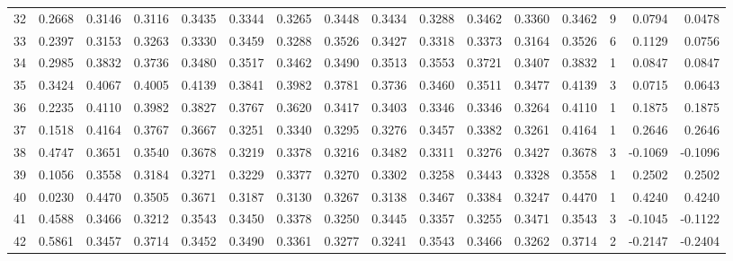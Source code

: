 \begin{tabular}{lrrrrrrrrrrrrrrr}
32  &      0.2668 &  0.3146 &  0.3116 &  0.3435 &  0.3344 &  0.3265 &  0.3448 &  0.3434 &  0.3288 &  0.3462 &   0.3360 &     0.3462 &      9 &                    0.0794 &                     0.0478 \\
33  &      0.2397 &  0.3153 &  0.3263 &  0.3330 &  0.3459 &  0.3288 &  0.3526 &  0.3427 &  0.3318 &  0.3373 &   0.3164 &     0.3526 &      6 &                    0.1129 &                     0.0756 \\
34  &      0.2985 &  0.3832 &  0.3736 &  0.3480 &  0.3517 &  0.3462 &  0.3490 &  0.3513 &  0.3553 &  0.3721 &   0.3407 &     0.3832 &      1 &                    0.0847 &                     0.0847 \\
35  &      0.3424 &  0.4067 &  0.4005 &  0.4139 &  0.3841 &  0.3982 &  0.3781 &  0.3736 &  0.3460 &  0.3511 &   0.3477 &     0.4139 &      3 &                    0.0715 &                     0.0643 \\
36  &      0.2235 &  0.4110 &  0.3982 &  0.3827 &  0.3767 &  0.3620 &  0.3417 &  0.3403 &  0.3346 &  0.3346 &   0.3264 &     0.4110 &      1 &                    0.1875 &                     0.1875 \\
37  &      0.1518 &  0.4164 &  0.3767 &  0.3667 &  0.3251 &  0.3340 &  0.3295 &  0.3276 &  0.3457 &  0.3382 &   0.3261 &     0.4164 &      1 &                    0.2646 &                     0.2646 \\
38  &      0.4747 &  0.3651 &  0.3540 &  0.3678 &  0.3219 &  0.3378 &  0.3216 &  0.3482 &  0.3311 &  0.3276 &   0.3427 &     0.3678 &      3 &                   -0.1069 &                    -0.1096 \\
39  &      0.1056 &  0.3558 &  0.3184 &  0.3271 &  0.3229 &  0.3377 &  0.3270 &  0.3302 &  0.3258 &  0.3443 &   0.3328 &     0.3558 &      1 &                    0.2502 &                     0.2502 \\
40  &      0.0230 &  0.4470 &  0.3505 &  0.3671 &  0.3187 &  0.3130 &  0.3267 &  0.3138 &  0.3467 &  0.3384 &   0.3247 &     0.4470 &      1 &                    0.4240 &                     0.4240 \\
41  &      0.4588 &  0.3466 &  0.3212 &  0.3543 &  0.3450 &  0.3378 &  0.3250 &  0.3445 &  0.3357 &  0.3255 &   0.3471 &     0.3543 &      3 &                   -0.1045 &                    -0.1122 \\
42  &      0.5861 &  0.3457 &  0.3714 &  0.3452 &  0.3490 &  0.3361 &  0.3277 &  0.3241 &  0.3543 &  0.3466 &   0.3262 &     0.3714 &      2 &                   -0.2147 &                    -0.2404 \\

\end{tabular}
